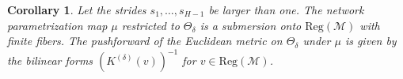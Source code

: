\documentclass[twoside]{article}
\newtheorem{corollary}[theorem]{Corollary}
\theoremstyle{definition}
\theoremstyle{remark}
\begin{document}

\begin{corollary}\label{cor:RiemannianMetric}
	Let the strides $s_1, \ldots, s_{H-1}$ be larger than one.
	The network parametrization map $\mu$ restricted to $\Theta_\delta$ is a submersion onto $\mathrm{Reg}(\mathcal{M})$ with finite fibers.
	The pushforward of the Euclidean metric on $\Theta_\delta$ under $\mu$ is given by the bilinear forms $(K^{(\delta)}(v))^{-1}$ for $v \in \mathrm{Reg}(\mathcal{M})$.
\end{corollary}
\end{document}
